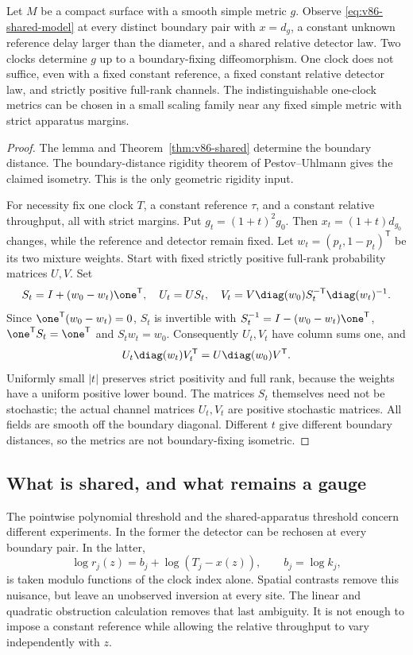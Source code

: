 \begin{corollary}
\label{cor:v86-shared-geometry}
Let $M$ be a compact surface with a smooth simple metric $g$. Observe
\eqref{eq:v86-shared-model} at every distinct boundary pair with
$x=d_g$, a constant unknown reference delay larger than the diameter,
and a shared relative detector law. Two clocks determine $g$ up to a
boundary-fixing diffeomorphism. One clock does not suffice, even with
a fixed constant reference, a fixed constant relative detector law,
and strictly positive full-rank channels. The indistinguishable
one-clock metrics can be chosen in a small scaling family near any
fixed simple metric with strict apparatus margins.
\end{corollary}
\begin{proof}
The lemma and Theorem~\ref{thm:v86-shared} determine the boundary
distance. The boundary-distance rigidity theorem of Pestov--Uhlmann
\cite{V84PU} gives the claimed isometry. This is the only geometric
rigidity input.

For necessity fix one clock $T$, a constant reference $\tau$, and a
constant relative throughput, all with strict margins. Put
$g_t=(1+t)^2g_0$. Then $x_t=(1+t)d_{g_0}$ changes, while the reference
and detector remain fixed. Let $w_t=(p_t,1-p_t)^{\mathsf T}$ be its
two mixture weights. Start with fixed strictly positive full-rank
probability matrices $U,V$. Set
\begin{equation}\label{eq:v86-one-clock-transform}
 S_t=I+(w_0-w_t)\one^{\mathsf T},\quad
 U_t=US_t,\quad V_t=V\diag(w_0)S_t^{-\mathsf T}\diag(w_t)^{-1}.
\end{equation}
Since $\one^{\mathsf T}(w_0-w_t)=0$, $S_t$ is invertible with
$S_t^{-1}=I-(w_0-w_t)\one^{\mathsf T}$,
$\one^{\mathsf T}S_t=\one^{\mathsf T}$ and $S_tw_t=w_0$.
Consequently $U_t,V_t$ have column sums one, and
\[
        U_t\diag(w_t)V_t^{\mathsf T}
                         =U\diag(w_0)V^{\mathsf T}.
\]
Uniformly small $|t|$ preserves strict positivity and full rank,
because the weights have a uniform positive lower bound. The matrices
$S_t$ themselves need not be stochastic; the actual channel matrices
$U_t,V_t$ are positive stochastic matrices. All fields are smooth off
the boundary diagonal. Different $t$ give different boundary distances,
so the metrics are not boundary-fixing isometric.
\end{proof}

\subsection{What is shared, and what remains a gauge}
The pointwise polynomial threshold and the shared-apparatus threshold
concern different experiments. In the former the detector can be
rechosen at every boundary pair. In the latter,
\[
       \log r_j(z)=b_j+\log(T_j-x(z)),\qquad b_j=\log k_j,
\]
is taken modulo functions of the clock index alone. Spatial contrasts
remove this nuisance, but leave an unobserved inversion at every site.
The linear and quadratic obstruction calculation removes that last
ambiguity. It is not enough to impose a constant reference while
allowing the relative throughput to vary independently with $z$.

